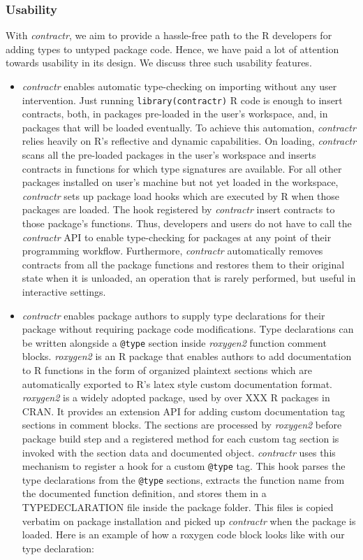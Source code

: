 \documentclass[acmsmall,review,anonymous]{acmart}\settopmatter{printfolios=true,printccs=false,printacmref=false}
\newcommand{\code}[1]{{\lstinline[style=Rin]!#1!}\xspace}
\newcommand{\contractr}{\emph{contractr}\xspace} %
\newcommand{\roxygen}{\emph{roxygen2}\xspace} %
\begin{document}
\subsubsection{Usability}
With \contractr, we aim to provide a hassle-free path to the R developers
for adding types to untyped package code. Hence, we have paid a lot of
attention towards usability in its design. We discuss three such usability
features.
\begin{itemize}

\item \contractr enables automatic type-checking on importing without any
  user intervention. Just running \code{library(contractr)} R code is enough
  to insert contracts, both, in packages pre-loaded in the user's workspace,
  and, in packages that will be loaded eventually. To achieve this
  automation, \contractr relies heavily on R's reflective and dynamic
  capabilities. On loading, \contractr scans all the pre-loaded packages in
  the user's workspace and inserts contracts in functions for which type
  signatures are available. For all other packages installed on user's
  machine but not yet loaded in the workspace, \contractr sets up package
  load hooks which are executed by R when those packages are loaded. The
  hook registered by \contractr insert contracts to those package's
  functions. Thus, developers and users do not have to call the \contractr
  API to enable type-checking for packages at any point of their programming
  workflow. Furthermore, \contractr automatically removes contracts from all
  the package functions and restores them to their original state when it is
  unloaded, an operation that is rarely performed, but useful in interactive
  settings.

\item \contractr enables package authors to supply type declarations for
  their package without requiring package code modifications. Type
  declarations can be written alongside a \code{@type} section inside
  \roxygen function comment blocks. \roxygen is an R package that enables
  authors to add documentation to R functions in the form of organized
  plaintext sections which are automatically exported to R's latex style
  custom documentation format.  \roxygen is a widely adopted package, used
  by over XXX R packages in CRAN. It provides an extension API for adding
  custom documentation tag sections in comment blocks. The sections are
  processed by \roxygen before package build step and a registered method
  for each custom tag section is invoked with the section data and
  documented object. \contractr uses this mechanism to register a hook for a
  custom \code{@type} tag. This hook parses the type declarations from the
  \code{@type} sections, extracts the function name from the documented
  function definition, and stores them in a TYPEDECLARATION file inside the
  package folder. This files is copied verbatim on package installation and
  picked up \contractr when the package is loaded. Here is an example of how
  a roxygen code block looks like with our type declaration:


\end{itemize}
\end{document}
